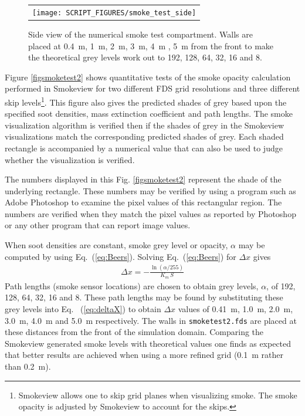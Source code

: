 \documentclass[11pt,twoside]{book}
\begin{document}
\begin{figure}[bph]
\begin{center}
 \centering
\begin{tabular}{c}
 \texttt{[image: SCRIPT\_FIGURES/smoke\_test\_side]}
 \end{tabular}
\end{center}
 \caption[Side view of numerical smoke test compartment.]{Side view of the numerical
 smoke test compartment.  Walls are placed at \SI{0.4}{m}, \SI{1}{m}, \SI{2}{m},
 \SI{3}{m}, \SI{4}{m} , \SI{5}{m} from the front to make the theoretical grey
 levels work out to 192, 128, 64, 32, 16 and 8.}
\label{figsmoketestgeom}%
\end{figure}

Figure \ref{figsmoketest2} shows quantitative tests of the smoke opacity
calculation performed in Smokeview for two different FDS grid resolutions
and three different skip levels\footnote{Smokeview allows one to skip grid planes when visualizing smoke.  The smoke opacity is adjusted by Smokeview to account for the skips.}. This figure also gives the predicted shades of grey based upon the specified soot densities, mass extinction coefficient and path lengths.  The smoke visualization algorithm is verified then if the shades of grey in the Smokeview visualizations match the corresponding predicted shades of grey.  Each shaded rectangle is accompanied by a numerical value that can also be used to judge whether the visualization is verified.

The numbers displayed in this Fig. \ref{figsmoketest2} represent the shade
of the underlying rectangle.  These numbers may be verified by using a
program such as Adobe Photoshop to examine the pixel values of this
rectangular region.  The numbers are verified when they match the pixel
values as reported by Photoshop or any other program that can report
image values.

When soot densities are constant, smoke grey level or opacity, $\alpha$
may be computed by using Eq.~(\ref{eq:Beers}).  Solving Eq.~(\ref{eq:Beers})
for $\Delta x$ gives
\begin{eqnarray}
\label{eq:deltaX}
\Delta x = -\frac{\ln(\alpha/255)}{K_m \, S}
\end{eqnarray}
Path lengths (smoke sensor locations) are chosen to obtain grey levels, $\alpha$,
of 192, 128, 64, 32, 16 and 8.  These path lengths may be found by substituting
these grey levels into Eq.~ (\ref{eq:deltaX}) to obtain $\Delta x$ values of
0.41~m, 1.0~m, 2.0~m, 3.0~m, 4.0~m and 5.0~m respectively.  The walls in
{\tt smoketest2.fds} are placed at these distances from the front of the
simulation domain. Comparing the Smokeview generated smoke levels with
theoretical values one finds as expected that better results are achieved
when using a more refined grid (0.1~m rather than 0.2~m).
\end{document}
